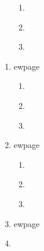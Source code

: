 \documentclass[12pt]{article}
\begin{document}
\begin{enumerate}
\begin{enumerate}
    \end{enumerate}    
    
    
    
ewpage
    \item \textit{}    
    
    \begin{enumerate}
      \item \textit{}



      \item \textit{}



      \item \textit{}



    \end{enumerate}    
    
    
    
ewpage
    \item \textit{}    
    
    \begin{enumerate}
      \item \textit{}



      \item \textit{}



      \item \textit{}



    \end{enumerate}    
    
    
    
ewpage
    \item \textit{}    
    
    \begin{enumerate}
      \item \textit{}



      \item \textit{}



      \item \textit{}



    \end{enumerate}    
    
    
    
ewpage
    \item \textit{}    
    

\end{enumerate}
\end{document}
